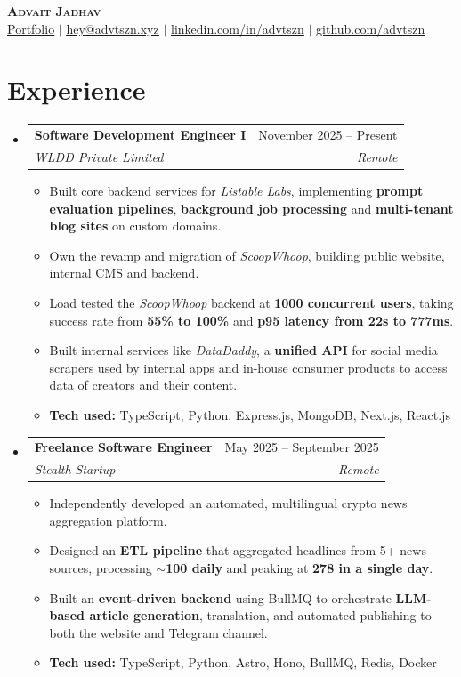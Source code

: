 \documentclass[letterpaper,11pt]{article}
\makeatletter
\newcommand{\resumeItem}[1]{\item\small{#1 \vspace{-2pt}}}
\newcommand{\resumeSubheading}[4]{
  \vspace{-2pt}\item
    \begin{tabular*}{0.97\textwidth}[t]{l@{\extracolsep{\fill}}r}
      \textbf{#1} & #2 \\
      \textit{\small#3} & \textit{\small #4} \\
    \end{tabular*}\vspace{-7pt}
}
\newcommand{\resumeItemListStart}{\begin{itemize}[leftmargin=0.15in]}
\newcommand{\resumeItemListEnd}{\end{itemize}\vspace{-5pt}}
\makeatother
\begin{document}
\begin{center}
    \textbf{\Huge \scshape Advait Jadhav} \\
    \small \href{https://advtszn.xyz}{\uline{Portfolio}} $|$ \href{mailto:hey@advtszn.xyz}{\uline{hey@advtszn.xyz}} $|$
    \href{https://linkedin.com/in/advtszn}{\uline{linkedin.com/in/advtszn}} $|$
    \href{https://github.com/advtszn}{\uline{github.com/advtszn}}
\end{center}


\section{Experience}
\resumeItemListStart
  \resumeSubheading
    {Software Development Engineer I}{November 2025 -- Present}
    {WLDD Private Limited}{Remote}
    \resumeItemListStart
      \resumeItem{Built core backend services for \textit{Listable Labs}, implementing \textbf{prompt evaluation pipelines}, \textbf{background job processing} and \textbf{multi-tenant blog sites} on custom domains.}
      \resumeItem{Own the revamp and migration of \textit{ScoopWhoop}, building public website, internal CMS and backend.}
      \resumeItem{Load tested the \textit{ScoopWhoop} backend at \textbf{1000 concurrent users}, taking success rate from \textbf{55\% to 100\%} and \textbf{p95 latency from 22s to 777ms}.}
      \resumeItem{Built internal services like \textit{DataDaddy}, a \textbf{unified API} for social media scrapers used by internal apps and in-house consumer products to access data of creators and their content.}
      \resumeItem{\textbf{Tech used:} TypeScript, Python, Express.js, MongoDB, Next.js, React.js}
    \resumeItemListEnd

  \resumeSubheading
    {Freelance Software Engineer}{May 2025 -- September 2025}
    {Stealth Startup}{Remote}
    \resumeItemListStart
      \resumeItem{Independently developed an automated, multilingual crypto news aggregation platform.}
      \resumeItem{Designed an \textbf{ETL pipeline} that aggregated headlines from 5+ news sources, processing \textbf{$\sim$100 daily} and peaking at \textbf{278 in a single day}.}
      \resumeItem{Built an \textbf{event-driven backend} using BullMQ to orchestrate \textbf{LLM-based article generation}, translation, and automated publishing to both the website and Telegram channel.}
      \resumeItem{\textbf{Tech used:} TypeScript, Python, Astro, Hono, BullMQ, Redis, Docker}
    \resumeItemListEnd
\resumeItemListEnd
\end{document}
